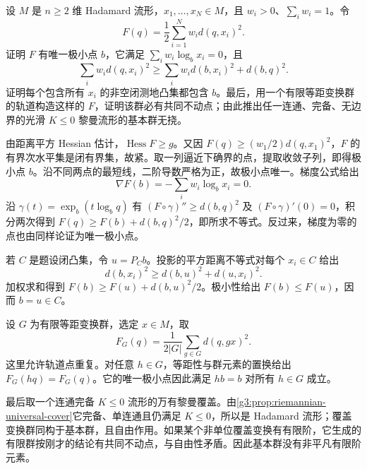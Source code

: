 \begin{exercise}\label{g3:ex:hadamard-barycenter}
	设 \(M\) 是 \(n\ge2\) 维 Hadamard 流形，\(x_1,\ldots,x_N\in M\)，且 \(w_i>0\)、\(\sum_iw_i=1\)。令
	\[
		F(q)=\frac12\sum_{i=1}^Nw_i d(q,x_i)^2.
	\]
	证明 \(F\) 有唯一极小点 \(b\)，它满足 \(\sum_iw_i\log_bx_i=0\)，且
	\[
		\sum_iw_id(q,x_i)^2
		\ge\sum_iw_id(b,x_i)^2+d(b,q)^2.
	\]
	证明每个包含所有 \(x_i\) 的非空闭测地凸集都包含 \(b\)。最后，用一个有限等距变换群的轨道构造这样的 \(F\)，证明该群必有共同不动点；由此推出任一连通、完备、无边界的光滑 \(K\le0\) 黎曼流形的基本群无挠。
\end{exercise}
\begin{solution}
	由距离平方 Hessian 估计，\(\operatorname{Hess}F\ge g\)。又因
	\(F(q)\ge(w_1/2)d(q,x_1)^2\)，\(F\) 的有界次水平集是闭有界集，故紧。取一列逼近下确界的点，提取收敛子列，即得极小点 \(b\)。沿不同两点的最短线，二阶导数严格为正，故极小点唯一。梯度公式给出
	\[
		\nabla F(b)=-\sum_iw_i\log_bx_i=0.
	\]
	沿 \(\gamma(t)=\exp_b(t\log_bq)\) 有 \((F\circ\gamma)''\ge d(b,q)^2\) 及 \((F\circ\gamma)'(0)=0\)，积分两次得到
	\(F(q)\ge F(b)+d(b,q)^2/2\)，即所求不等式。反过来，梯度为零的点也由同样论证为唯一极小点。

	若 \(C\) 是题设闭凸集，令 \(u=P_Cb\)。投影的平方距离不等式对每个 \(x_i\in C\) 给出
	\[
		d(b,x_i)^2\ge d(b,u)^2+d(u,x_i)^2.
	\]
	加权求和得到 \(F(b)\ge F(u)+d(b,u)^2/2\)。极小性给出 \(F(b)\le F(u)\)，因而 \(b=u\in C\)。

	设 \(G\) 为有限等距变换群，选定 \(x\in M\)，取
	\[
		F_G(q)=\frac1{2|G|}\sum_{g\in G}d(q,gx)^2.
	\]
	这里允许轨道点重复。对任意 \(h\in G\)，等距性与群元素的置换给出 \(F_G(hq)=F_G(q)\)。它的唯一极小点因此满足 \(hb=b\) 对所有 \(h\in G\) 成立。

	最后取一个连通完备 \(K\le0\) 流形的万有黎曼覆盖。由\cref{g3:prop:riemannian-universal-cover}它完备、单连通且仍满足 \(K\le0\)，所以是 Hadamard 流形；覆盖变换群同构于基本群，且自由作用。如果某个非单位覆盖变换有有限阶，它生成的有限群按刚才的结论有共同不动点，与自由性矛盾。因此基本群没有非平凡有限阶元素。
\end{solution}

